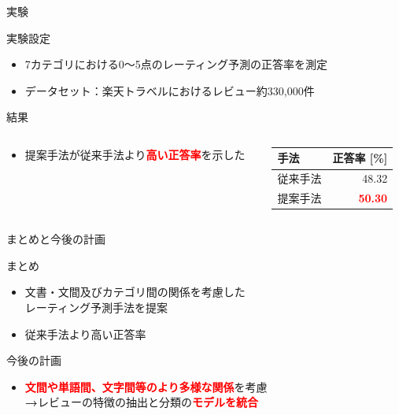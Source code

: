 \documentclass[aspectratio=43,unicode,10pt]{beamer}
\newcommand{\fire}[1]{\textcolor{red}{\textbf{#1}}}
\newcommand{\arrow}{\textcolor{ttiblue}{\textbf{→}}\hspace{1ex}}
\begin{document}
\begin{frame}{実験}{}
  \begin{block}{実験設定}
    \begin{itemize}
      \item 7カテゴリにおける0〜5点のレーティング予測の正答率を測定
      \item データセット：楽天トラベルにおけるレビュー約330,000件
    \end{itemize}
  \end{block}
  \begin{block}{結果}
    \begin{columns}[onlytextwidth,t]
      \begin{column}{0.6\linewidth}
        \begin{itemize}
          \item 提案手法が従来手法より\fire{高い正答率}を示した
        \end{itemize}
      \end{column}
      \begin{column}{0.4\linewidth}
        \begin{table}
          \centering
          \begin{tabular}{l | r}
            手法 & 正答率 {[}\%{]} \\
            \hline
            従来手法 & 48.32 \\
            提案手法 & \fire{50.30} \\
          \end{tabular}
        \end{table}
      \end{column}
    \end{columns}
  \end{block}
\end{frame}

\begin{frame}{まとめと今後の計画}{}
  \begin{block}{まとめ}
    \begin{itemize}
      \item 文書・文間及びカテゴリ間の関係を考慮した \\
            レーティング予測手法を提案
      \item 従来手法より高い正答率
    \end{itemize}
  \end{block}
  \begin{block}{今後の計画}
    \begin{itemize}
      \item \fire{文間や単語間、文字間等のより多様な関係}を考慮 \\
            \arrow レビューの特徴の抽出と分類の\fire{モデルを統合}
    \end{itemize}
  \end{block}
\end{frame}
\end{document}
